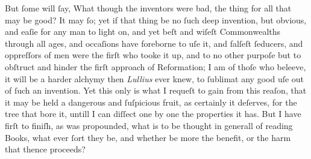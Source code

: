 But ſome will ſay, What though the inventors were bad, the thing for all that
may be good?  It may ſo; yet if that thing be no ſuch deep invention, but
obvious, and eaſie for any man to light on, and yet beſt and wiſeſt
Commonwealths through all ages, and occaſions have foreborne to uſe it, and
falſeſt ſeducers, and oppreſſors of men were the firſt who tooke it up, and to
no other purpoſe but to obſtruct and hinder the firſt approach of Reformation; I
am of thoſe who beleeve, it will be a harder alchymy then \textit{Lullius} ever
knew, to ſublimat any good uſe out of ſuch an invention.  Yet this only is what
I requeſt to gain from this reaſon, that it may be held a dangerous and
ſuſpicious fruit, as certainly it deſerves, for the tree that bore it, untill I
can diſſect one by one the properties it has.  But I have firſt to finiſh, as
was propounded, what is to be thought in generall of reading Books, what ever
ſort they be, and whether be more the benefit, or the harm that thence proceeds?

